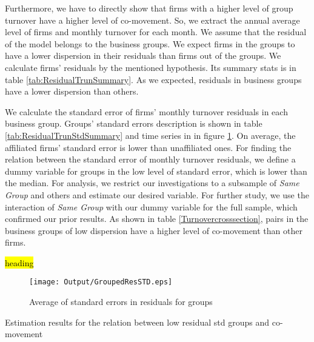 Furthermore, we have to directly show that firms with a higher level of group turnover have a higher level of co-movement. So, we extract the annual average level of firms and monthly turnover for each month. We assume that the residual of the model belongs to the business groups. We expect firms in the groups to have a lower dispersion in their residuals than firms out of the groups. We calculate firms' residuals by the mentioned hypothesis. Its summary stats is in table \ref{tab:ResidualTrunSummary}. As we expected, residuals in business groups have a lower dispersion than others.


We calculate the standard error of firms' monthly turnover residuals in each business group. Groups' standard errors description is shown in table \ref{tab:ResidualTrunStdSummary} and time series in in figure \ref{fig:GroupedResSTD}. On average, the affiliated firms' standard error is lower than unaffiliated ones. For finding the relation between the standard error of monthly turnover residuals, we define a dummy variable for groups in the low level of standard error, which is lower than the median. For analysis, we restrict our investigations to a subsample of \textit{Same Group} and others and estimate our desired variable.   For further study, we use the interaction of \textit{Same Group} with our dummy variable for the full sample, which confirmed our prior results. As shown in table \ref{Turnovercrosssection}, pairs in the business groups of low dispersion have a higher level of co-movement than other firms.



{			\begin{table}[htbp]
\caption{\hl{heading}}
	\centering
	\label{tab:ResidualTrunSummary}
	\resizebox{0.8\textwidth}{!}{
		
	}

			\centering
			\label{tab:ResidualTrunStdSummary}
			\resizebox{0.8\textwidth}{!}{
				
			}
		\end{table}
		
		
		
\begin{figure}[htbp]
	\centering
	\texttt{[image: Output/GroupedResSTD.eps]}

	\caption{Average of standard errors in residuals for groups}
	\label{fig:GroupedResSTD}
\end{figure}


		\begin{table}[htbp]
			\centering
			\caption{Estimation results for the relation between low residual std groups and co-movement}
			\label{Turnovercrosssection}			
			\resizebox{\textwidth}{!}{
				\centering
				
			}			
		\end{table}}




